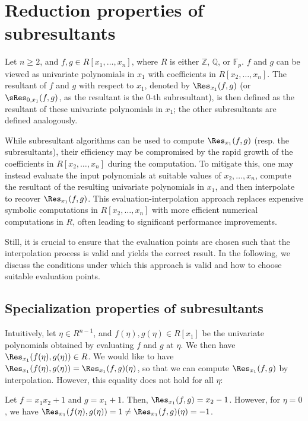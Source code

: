 \section{Reduction properties of subresultants}

Let $n\geq 2$, and $f,g\in R[x_1,\dots,x_n]$, where $R$ is either $\mathbb{Z}$, $\mathbb{Q}$, or $\mathbb{F}_{p}$. $f$ and $g$ can be viewed as univariate polynomials in $x_1$ with coefficients in $R[x_2,\dots,x_n]$.
The resultant of $f$ and $g$ with respect to $x_1$, denoted by $\Res_{x_1}(f,g)$ (or $\sRes_{0,x_1}(f,g)$, as the resultant is the $0$-th subresultant), is then defined as the resultant of these univariate polynomials in $x_1$; the other subresultants are defined analogously.

While subresultant algorithms can be used to compute $\Res_{x_1}(f,g)$ (resp. the subresultants), their efficiency may be compromised by the rapid growth of the coefficients in $R[x_2,\dots,x_n]$ during the computation. To mitigate this, one may instead evaluate the input polynomials at suitable values of $x_2,\dots,x_n$, compute the resultant of the resulting univariate polynomials in $x_1$, and then interpolate to recover $\Res_{x_1}(f,g)$. This evaluation-interpolation approach replaces expensive symbolic computations in $R[x_2,\dots,x_n]$ with more efficient numerical computations in $R$, often leading to significant performance improvements.

Still, it is crucial to ensure that the evaluation points are chosen such that the interpolation process is valid and yields the correct result. In the following, we discuss the conditions under which this approach is valid and how to choose suitable evaluation points.

\subsection{Specialization properties of subresultants}

Intuitively, let $\eta\in R^{n-1}$, and $f(\eta),g(\eta)\in R[x_1]$ be the univariate polynomials obtained by evaluating $f$ and $g$ at $\eta$. We then have $\Res_{x_1}(f(\eta),g(\eta))\in R$. We would like to have $\Res_{x_1}(f(\eta),g(\eta))=\Res_{x_1}(f,g)(\eta)$, so that we can compute $\Res_{x_1}(f,g)$ by interpolation. However, this equality does not hold for all $\eta$:

\begin{example}
    Let $f=x_1x_2+1$ and $g=x_1+1$. Then, $\Res_{x_1}(f,g)=x_2-1$. However, for $\eta=0$, we have $\Res_{x_1}(f(\eta),g(\eta))=1\neq\Res_{x_1}(f,g)(\eta)=-1$.
\end{example}

